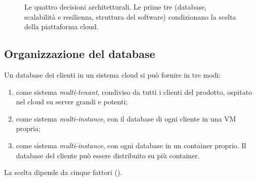 \begin{figure}[ht]
\centering
{}
\caption{Le quattro decisioni architetturali. Le prime tre (database, scalabilità e resilienza, struttura del software)
condizionano la scelta della piattaforma cloud.}
\label{fig:cloud-decisioni}
\end{figure}

\subsection{Organizzazione del database}
\label{sec:cloud-db}

Un database dei clienti in un sistema cloud si può fornire in tre modi:
\begin{enumerate}
  \item come sistema \emph{multi-tenant}, condiviso da tutti i clienti del prodotto, ospitato nel cloud su server grandi e
    potenti;
  \item come sistema \emph{multi-instance}, con il database di ogni cliente in una VM propria;
  \item come sistema \emph{multi-instance}, con ogni database in un container proprio. Il database del cliente può
    essere distribuito su più container.
\end{enumerate}

La scelta dipende da cinque fattori ().

